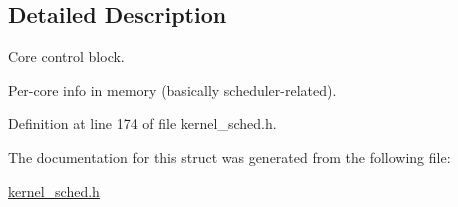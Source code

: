 \subsection{Detailed Description}
Core control block. 

Per-\/core info in memory (basically scheduler-\/related). 

Definition at line 174 of file kernel\+\_\+sched.\+h.



The documentation for this struct was generated from the following file\+:\begin{DoxyCompactItemize}
\item 
\hyperlink{kernel__sched_8h}{kernel\+\_\+sched.\+h}\end{DoxyCompactItemize}
